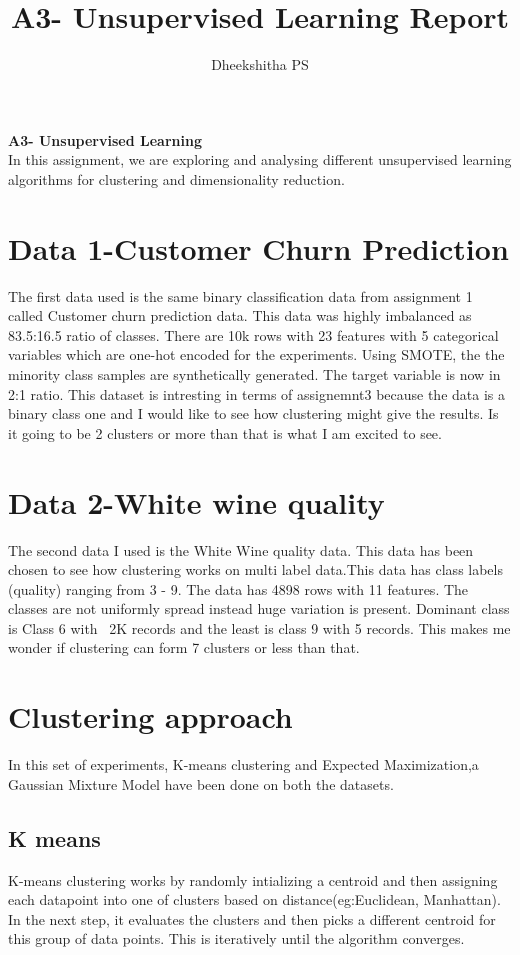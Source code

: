 \documentclass[12pt]{article}
\begin{document}
\title{A3- Unsupervised Learning Report}
\author{Dheekshitha PS}
\textbf{A3- Unsupervised Learning} \\


In this assignment, we are exploring and analysing different unsupervised learning algorithms for clustering and dimensionality reduction. 


\section{Data 1-Customer Churn Prediction}

The first data used is the same binary classification data from assignment 1 called Customer churn prediction data. This data was highly imbalanced as 83.5:16.5 ratio of classes. There are 10k rows with 23 features with 5 categorical variables which are one-hot encoded for the experiments. Using SMOTE, the the minority class samples are synthetically generated. The target variable is now in 2:1 ratio. This dataset is intresting in terms of assignemnt3 because the data is a binary class one and I would like to see how clustering might give the results. Is it going to be 2 clusters or more than that is what I am excited to see.

\section{Data 2-White wine quality}

The second data I used is the White Wine quality data. This data has been chosen to see how clustering works on multi label data.This data has class labels (quality) ranging from 3 - 9. The data has 4898 rows with 11 features. The classes are not uniformly spread instead huge variation is present. Dominant class is Class 6 with ~2K records and the least is class 9 with 5 records. This makes me wonder if clustering can form 7 clusters or less than that.


\section{Clustering approach}

In this set of experiments, K-means clustering and Expected Maximization,a Gaussian Mixture Model have been done on both the datasets. 
\subsection{K means}
K-means clustering works by randomly intializing a centroid and then assigning each datapoint into one of clusters based on distance(eg:Euclidean, Manhattan). In the next step, it evaluates the clusters and then picks a different centroid for this group of data points. This is iteratively until the algorithm converges.	
\end{document}
